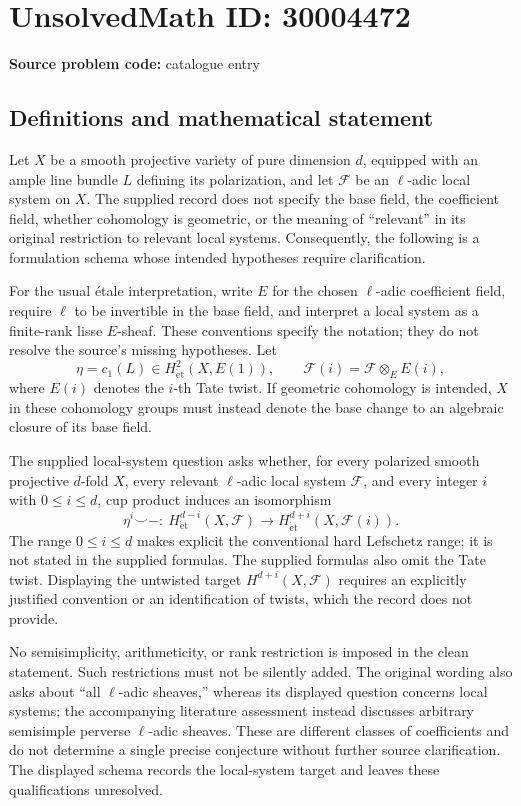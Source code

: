 \documentclass[11pt]{article}
\begin{document}
\section*{UnsolvedMath ID: 30004472}
\textbf{Source problem code:} catalogue entry
\subsection{Definitions and mathematical statement}
Let \(X\) be a smooth projective variety of pure dimension \(d\), equipped with an ample line bundle \(L\) defining its polarization, and let \(\mathcal F\) be an \(\ell\)-adic local system on \(X\). The supplied record does not specify the base field, the coefficient field, whether cohomology is geometric, or the meaning of ``relevant'' in its original restriction to relevant local systems. Consequently, the following is a formulation schema whose intended hypotheses require clarification.

For the usual étale interpretation, write \(E\) for the chosen \(\ell\)-adic coefficient field, require \(\ell\) to be invertible in the base field, and interpret a local system as a finite-rank lisse \(E\)-sheaf. These conventions specify the notation; they do not resolve the source's missing hypotheses. Let
\[
\eta=c_1(L)\in H^2_{\mathrm{\acute et}}(X,E(1)),
\qquad
\mathcal F(i)=\mathcal F\otimes_E E(i),
\]
where \(E(i)\) denotes the \(i\)-th Tate twist. If geometric cohomology is intended, \(X\) in these cohomology groups must instead denote the base change to an algebraic closure of its base field.

The supplied local-system question asks whether, for every polarized smooth projective \(d\)-fold \(X\), every relevant \(\ell\)-adic local system \(\mathcal F\), and every integer \(i\) with \(0\leq i\leq d\), cup product induces an isomorphism
\[
\eta^i\smile-:\ H^{d-i}_{\mathrm{\acute et}}(X,\mathcal F)
\longrightarrow
H^{d+i}_{\mathrm{\acute et}}(X,\mathcal F(i)).
\]
The range \(0\leq i\leq d\) makes explicit the conventional hard Lefschetz range; it is not stated in the supplied formulas. The supplied formulas also omit the Tate twist. Displaying the untwisted target \(H^{d+i}(X,\mathcal F)\) requires an explicitly justified convention or an identification of twists, which the record does not provide.

No semisimplicity, arithmeticity, or rank restriction is imposed in the clean statement. Such restrictions must not be silently added. The original wording also asks about ``all \(\ell\)-adic sheaves,'' whereas its displayed question concerns local systems; the accompanying literature assessment instead discusses arbitrary semisimple perverse \(\ell\)-adic sheaves. These are different classes of coefficients and do not determine a single precise conjecture without further source clarification. The displayed schema records the local-system target and leaves these qualifications unresolved.
\end{document}

